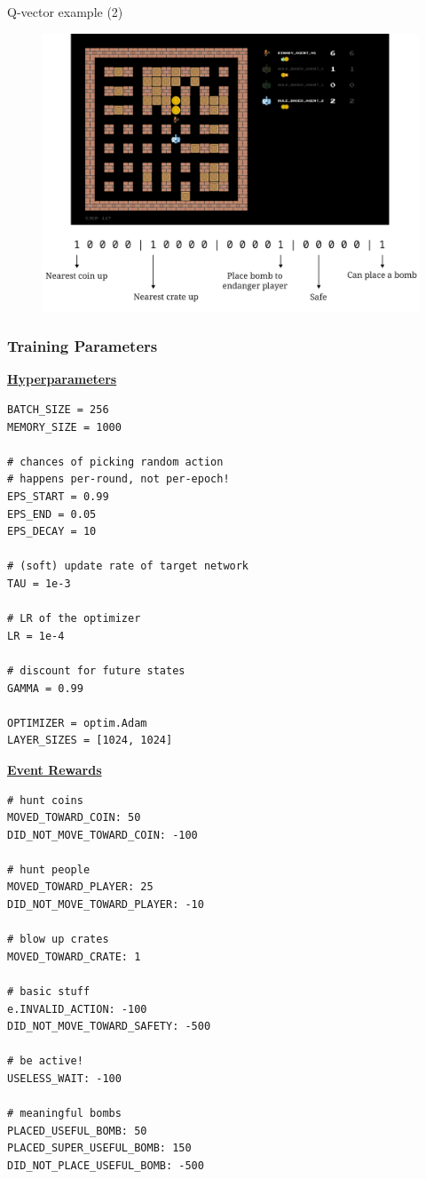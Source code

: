 \documentclass{beamer}
\begin{document}
\begin{frame}{Q-vector example (2)}
	\pause
	\begin{figure}[t]
			\centering
			\includegraphics[width=.8\linewidth]{q-vector-2.pdf}
	\end{figure}
\end{frame}

\begin{frame}[fragile]
	\frametitle{Training Parameters}
	\pause
	\vspace{-1.3em}%
	\begin{minipage}[t]{.5\textwidth}
\small
\underline{\textbf{Hyperparameters}}
\fontsize{6}{8}
\begin{verbatim}
BATCH_SIZE = 256
MEMORY_SIZE = 1000

# chances of picking random action
# happens per-round, not per-epoch!
EPS_START = 0.99
EPS_END = 0.05
EPS_DECAY = 10

# (soft) update rate of target network
TAU = 1e-3

# LR of the optimizer
LR = 1e-4

# discount for future states
GAMMA = 0.99

OPTIMIZER = optim.Adam
LAYER_SIZES = [1024, 1024]
\end{verbatim}
\end{minipage}%
	\begin{minipage}[t]{.5\textwidth}
\small
\underline{\textbf{Event Rewards}}
\fontsize{6}{8}
\begin{verbatim}
# hunt coins
MOVED_TOWARD_COIN: 50
DID_NOT_MOVE_TOWARD_COIN: -100

# hunt people
MOVED_TOWARD_PLAYER: 25
DID_NOT_MOVE_TOWARD_PLAYER: -10

# blow up crates
MOVED_TOWARD_CRATE: 1

# basic stuff
e.INVALID_ACTION: -100
DID_NOT_MOVE_TOWARD_SAFETY: -500

# be active!
USELESS_WAIT: -100

# meaningful bombs
PLACED_USEFUL_BOMB: 50
PLACED_SUPER_USEFUL_BOMB: 150
DID_NOT_PLACE_USEFUL_BOMB: -500
\end{verbatim}
\end{minipage}%
\end{frame}
\end{document}
